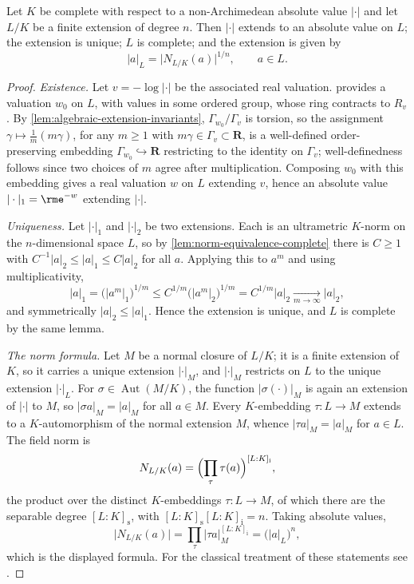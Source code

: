 \begin{theorem}\label{thm:complete-field-extension}
Let $K$ be complete with respect to a non-Archimedean absolute value
$|\cdot|$ and let $L/K$ be a finite extension of degree $n$. Then
$|\cdot|$ extends to an absolute value on $L$; the extension is unique;
$L$ is complete; and the extension is given by
\[
 |a|_L=\bigl|N_{L/K}(a)\bigr|^{1/n},
 \qquad a\in L.
\]
\end{theorem}
\begin{proof}
\emph{Existence.} Let $v=-\log|\cdot|$ be the associated real valuation.
 provides a valuation $w_0$ on $L$, with
values in some ordered group, whose ring contracts to $R_v$. By
\cref{lem:algebraic-extension-invariants}, $\Gamma_{w_0}/\Gamma_v$ is
torsion, so the assignment
$\gamma\mapsto\frac1m(m\gamma)$, for any $m\geq1$ with
$m\gamma\in\Gamma_v\subset\mathbf R$, is a well-defined order-preserving
embedding $\Gamma_{w_0}\hookrightarrow\mathbf R$ restricting to the
identity on $\Gamma_v$; well-definedness follows since two choices of
$m$ agree after multiplication. Composing $w_0$ with this embedding gives
a real valuation $w$ on $L$ extending $v$, hence an absolute value
$|\cdot|_1=\rme^{-w}$ extending $|\cdot|$.

\emph{Uniqueness.} Let $|\cdot|_1$ and $|\cdot|_2$ be two extensions.
Each is an ultrametric $K$-norm on the $n$-dimensional space $L$, so by
\cref{lem:norm-equivalence-complete} there is $C\geq1$ with
$C^{-1}|a|_2\leq|a|_1\leq C|a|_2$ for all $a$. Applying this to $a^m$ and
using multiplicativity,
\[
 |a|_1=\bigl(|a^m|_1\bigr)^{1/m}
 \leq C^{1/m}\bigl(|a^m|_2\bigr)^{1/m}=C^{1/m}|a|_2
 \xrightarrow[m\to\infty]{}|a|_2,
\]
and symmetrically $|a|_2\leq|a|_1$. Hence the extension is unique, and
$L$ is complete by the same lemma.

\emph{The norm formula.} Let $M$ be a normal closure of $L/K$; it is a
finite extension of $K$, so it carries a unique extension $|\cdot|_M$,
and $|\cdot|_M$ restricts on $L$ to the unique extension $|\cdot|_L$.
For $\sigma\in\operatorname{Aut}(M/K)$, the function
$|\sigma(\cdot)|_M$ is again an extension of $|\cdot|$ to $M$, so
$|\sigma a|_M=|a|_M$ for all $a\in M$. Every $K$-embedding
$\tau:L\to M$ extends to a $K$-automorphism of the normal extension $M$,
whence $|\tau a|_M=|a|_M$ for $a\in L$. The field norm is
\[
 N_{L/K}(a)=\Bigl(\prod_{\tau}\tau(a)\Bigr)^{[L:K]_{\mathrm i}},
\]
the product over the distinct $K$-embeddings $\tau:L\to M$, of which
there are the separable degree $[L:K]_{\mathrm s}$, with
$[L:K]_{\mathrm s}[L:K]_{\mathrm i}=n$. Taking absolute values,
\[
 \bigl|N_{L/K}(a)\bigr|
 =\prod_\tau|\tau a|_M^{[L:K]_{\mathrm i}}
 =\bigl(|a|_L\bigr)^{n},
\]
which is the displayed formula. For the classical treatment of these
statements see \cite[Chapter~VI, \S8]{AC}.
\end{proof}

